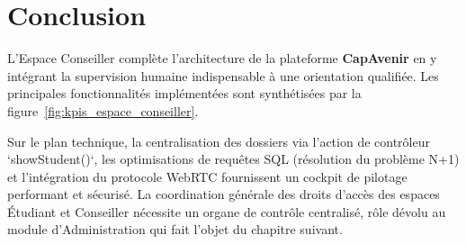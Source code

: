 \section*{Conclusion}

L'Espace Conseiller complète l'architecture de la plateforme \textbf{CapAvenir} en y intégrant la supervision humaine indispensable à une orientation qualifiée. Les principales fonctionnalités implémentées sont synthétisées par la figure~\ref{fig:kpis_espace_conseiller}.

Sur le plan technique, la centralisation des dossiers via l'action de contrôleur `showStudent()`, les optimisations de requêtes SQL (résolution du problème N+1) et l'intégration du protocole WebRTC fournissent un cockpit de pilotage performant et sécurisé. La coordination générale des droits d'accès des espaces Étudiant et Conseiller nécessite un organe de contrôle centralisé, rôle dévolu au module d'Administration qui fait l'objet du chapitre suivant.

